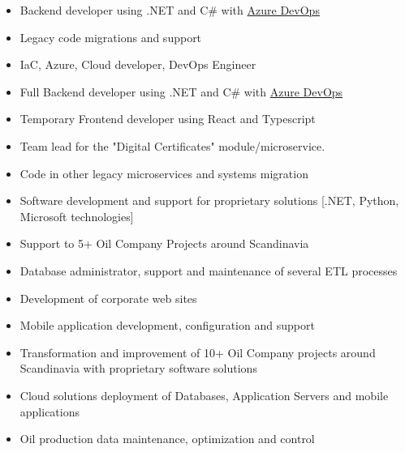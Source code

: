 
\begin{itemize}
    \item Backend developer using .NET and C# with \href{dev.azure.com}{Azure DevOps} 
    \item Legacy code migrations and support
    \item IaC, Azure, Cloud developer, DevOps Engineer
\end{itemize}

\divider


\begin{itemize}
    \item Full Backend developer using .NET and C# with \href{dev.azure.com}{Azure DevOps} 
    \item Temporary Frontend developer using React and Typescript
    \item Team lead for the "Digital Certificates"  module/microservice.
    \item Code in other legacy microservices and systems migration
\end{itemize}

\divider

\begin{itemize}
\item Software development and support for proprietary solutions [.NET, Python, Microsoft technologies]
\item Support to 5+ Oil Company Projects around Scandinavia
\item Database administrator, support and maintenance of several ETL processes
\item Development of corporate web sites
\item Mobile application development, configuration and support
\end{itemize}

\divider

\begin{itemize}
\item Transformation and improvement of 10+ Oil Company projects around Scandinavia with proprietary software solutions
\item Cloud solutions deployment of Databases, Application Servers and mobile applications
\item Oil production data maintenance, optimization and control
\end{itemize}


